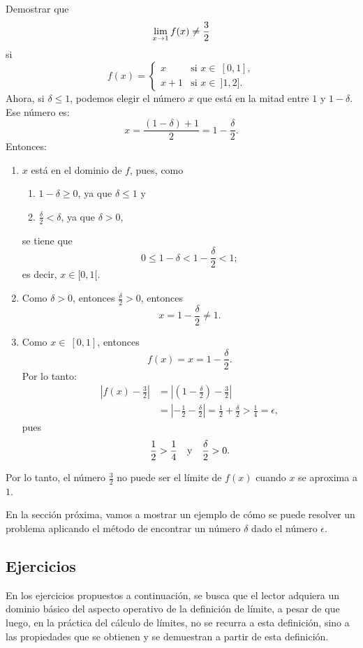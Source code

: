 \begin{exemplo}[Solución]{%
Demostrar que
\[
\limjc{f(x)}{x}{1} \neq \frac{3}{2}
\]
si
\[
f(x) =
\begin{cases}
x & \text{si } x \in\ [0,1],\\
x + 1 & \text{si } x \in\ ]1,2].
\end{cases}
\]
}
Ahora, si $\delta \leq 1$, podemos elegir el número $x$ que está en la mitad entre $1$ y
$1-\delta$. Ese número es:
\[
x = \frac{(1-\delta) + 1}{2} = 1 - \frac{\delta}{2}.
\]
Entonces:
\begin{enumerate}
\item $x$ está en el dominio de $f$, pues, como
\begin{enumerate}
\item $1 - \delta \geq 0$, ya que $\delta \leq 1$ y
\item $\frac{\delta}{2} < \delta$, ya que $\delta > 0$,
\end{enumerate}
se tiene que
\[
0 \leq 1 - \delta < 1 - \frac{\delta}{2} < 1;
\]
es decir, $x\in [0,1[$.
\item Como $\delta > 0$, entonces $\frac{\delta}{2} > 0$, entonces
\[
x = 1 - \frac{\delta}{2} \neq 1.
\]
\item Como $x\in\ [0,1]$, entonces
\[
f(x) = x = 1 - \frac{\delta}{2}.
\]
Por lo tanto:
\begin{align*}
\left|f(x) - \frac{3}{2}\right| &= \left|\left(1 - \frac{\delta}{2}\right) - \frac{3}{2}\right|
\\
&= \left|-\frac{1}{2} - \frac{\delta}{2}\right| = \frac{1}{2} + \frac{\delta}{2} > \frac{1}{4} = \epsilon,
\end{align*}
pues
\[
\frac{1}{2} > \frac{1}{4}\yjc \frac{\delta}{2} > 0.
\]
\end{enumerate}

Por lo tanto, el número $\frac{3}{2}$ no puede ser el límite de $f(x)$ cuando $x$ se aproxima a
$1$.
\end{exemplo}

En la sección próxima, vamos a mostrar un ejemplo de cómo se puede resolver un problema aplicando
el método de encontrar un número $\delta$ dado el número $\epsilon$.

\subsection{Ejercicios}
\begingroup
\small En los ejercicios propuestos a continuación, se busca que el lector adquiera un dominio
básico del aspecto operativo de la definición de límite, a pesar de que luego, en la práctica del
cálculo de límites, no se recurra a esta definición, sino a las propiedades que se obtienen y se
demuestran a partir de esta definición.


